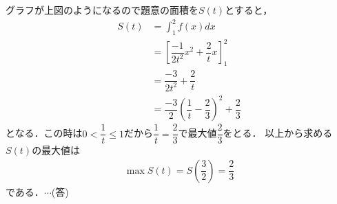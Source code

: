 \documentclass[../../main.tex]{subfiles}
\begin{document}
グラフが上図のようになるので題意の面積を$S(t)$とすると，
\begin{align}
  S(t)&=\int_1^2f(x)dx \\
  &=\left[\dfrac{-1}{2t^2}x^2+\dfrac{2}{t}x\right]_1^2  \\
  &=\dfrac{-3}{2t^2}+\dfrac{2}{t} \\
  &=\dfrac{-3}{2}\left(\dfrac{1}{t}-\dfrac{2}{3}\right)^2+\dfrac{2}{3}
\end{align}
となる．この時は$0<\dfrac{1}{t}\le1$だから$\dfrac{1}{t}=\dfrac{2}{3}$で最大値$\dfrac{2}{3}$をとる．
以上から求める$S(t)$の最大値は
\begin{align}
  \max S(t)=S\left(\dfrac{3}{2}\right)=\dfrac{2}{3}
\end{align}
である．$\cdots$(答)

\newpage
\end{document}
